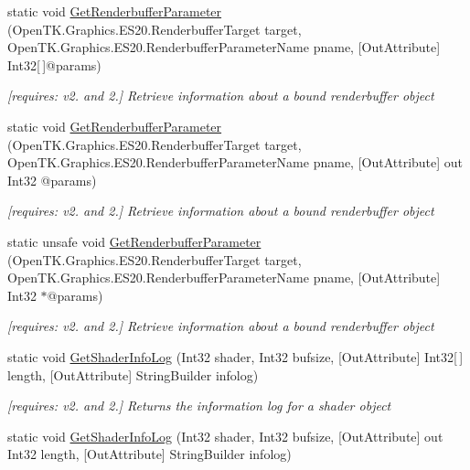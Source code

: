 \begin{DoxyCompactItemize}
static void \hyperlink{class_open_t_k_1_1_graphics_1_1_e_s20_1_1_g_l_a15ccb2023572cf58147da9159010ecbd}{Get\-Renderbuffer\-Parameter} (Open\-T\-K.\-Graphics.\-E\-S20.\-Renderbuffer\-Target target, Open\-T\-K.\-Graphics.\-E\-S20.\-Renderbuffer\-Parameter\-Name pname, \mbox{[}Out\-Attribute\mbox{]} Int32\mbox{[}$\,$\mbox{]}@params)
\begin{DoxyCompactList}\small\item\em \mbox{[}requires\-: v2. and 2.\mbox{]} Retrieve information about a bound renderbuffer object \end{DoxyCompactList}\item 
static void \hyperlink{class_open_t_k_1_1_graphics_1_1_e_s20_1_1_g_l_a053a0550f04b8e5fde51fd5e2d74a69f}{Get\-Renderbuffer\-Parameter} (Open\-T\-K.\-Graphics.\-E\-S20.\-Renderbuffer\-Target target, Open\-T\-K.\-Graphics.\-E\-S20.\-Renderbuffer\-Parameter\-Name pname, \mbox{[}Out\-Attribute\mbox{]} out Int32 @params)
\begin{DoxyCompactList}\small\item\em \mbox{[}requires\-: v2. and 2.\mbox{]} Retrieve information about a bound renderbuffer object \end{DoxyCompactList}\item 
static unsafe void \hyperlink{class_open_t_k_1_1_graphics_1_1_e_s20_1_1_g_l_a083d58df67e0fcfe5b5952d0e360b7d8}{Get\-Renderbuffer\-Parameter} (Open\-T\-K.\-Graphics.\-E\-S20.\-Renderbuffer\-Target target, Open\-T\-K.\-Graphics.\-E\-S20.\-Renderbuffer\-Parameter\-Name pname, \mbox{[}Out\-Attribute\mbox{]} Int32 $\ast$@params)
\begin{DoxyCompactList}\small\item\em \mbox{[}requires\-: v2. and 2.\mbox{]} Retrieve information about a bound renderbuffer object \end{DoxyCompactList}\item 
static void \hyperlink{class_open_t_k_1_1_graphics_1_1_e_s20_1_1_g_l_a2a978a198233371af3f548c31f396651}{Get\-Shader\-Info\-Log} (Int32 shader, Int32 bufsize, \mbox{[}Out\-Attribute\mbox{]} Int32\mbox{[}$\,$\mbox{]} length, \mbox{[}Out\-Attribute\mbox{]} String\-Builder infolog)
\begin{DoxyCompactList}\small\item\em \mbox{[}requires\-: v2. and 2.\mbox{]} Returns the information log for a shader object \end{DoxyCompactList}\item 
static void \hyperlink{class_open_t_k_1_1_graphics_1_1_e_s20_1_1_g_l_ac1e5d1211df30bf40434a7b78db3bf53}{Get\-Shader\-Info\-Log} (Int32 shader, Int32 bufsize, \mbox{[}Out\-Attribute\mbox{]} out Int32 length, \mbox{[}Out\-Attribute\mbox{]} String\-Builder infolog)

\end{DoxyCompactItemize}
